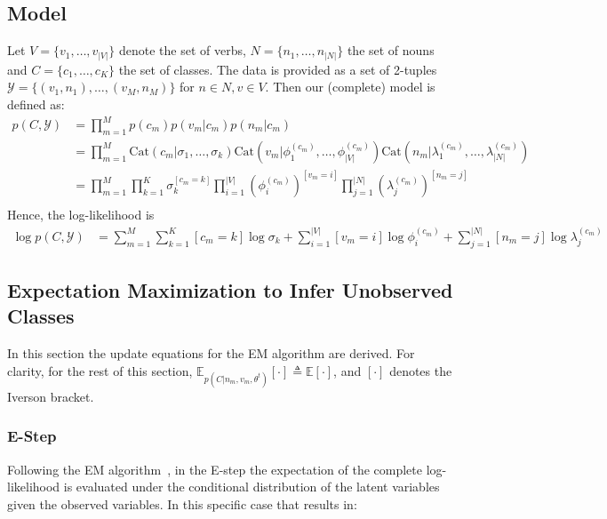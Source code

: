 \documentclass[11pt]{scrartcl}
\newcommand{\cat}{\text{Cat}}
\newcommand{\thetaold}{\theta^{t}}
\begin{document}
\subsection{Model}
\label{sec:model}
Let $V = \{v_1, \ldots, v_{|V|}\}$ denote the set of verbs, $N =
\{n_1, \ldots, n_{|N|}\}$ the set of nouns and $C = \{c_1,\ldots,
c_K\}$ the set of classes. The data is provided as a set of 2-tuples
$\mathcal{Y} = \{(v_1, n_1), \ldots, (v_M, n_M)\}$ for $n \in N, v \in V$.  Then our
(complete) model is defined as:
\begin{align}
  p(C, \mathcal{Y}) &= \prod_{m=1}^{M}p(c_m)p(v_m|c_m)p(n_m|c_m) \\
             &= \prod_{m=1}^{M}
                \cat(c_m|\sigma_1, \ldots, \sigma_k)
                \cat(v_m|\phi_1^{(c_m)}, \ldots, \phi_{|V|}^{(c_m)})
                \cat(n_m|\lambda_1^{(c_m)}, \ldots, \lambda_{|N|}^{(c_m)}) \\
             &= \prod_{m=1}^{M}
                \prod_{k=1}^K \sigma_k^{[c_m=k]} 
                \prod_{i=1}^{|V|} {(\phi_i^{(c_m)})}^{[v_m=i]}
                \prod_{j=1}^{|N|} {(\lambda_j^{(c_m)})}^{[n_m=j]} \\
 \end{align}
 Hence, the log-likelihood is
 \begin{align}
   \log p(C, \mathcal{Y})
   &=
     \sum_{m=1}^{M}
     \sum_{k=1}^K [c_m = k]\log \sigma_k +
     \sum_{i=1}^{|V|} [v_m = i]\log \phi_i^{(c_m)} +
     \sum_{j=1}^{|N|} [n_m = j]\log \lambda_j^{(c_m)}
 \end{align}


\subsection{Expectation Maximization to Infer Unobserved Classes}
\label{sec:em}
In this section the update equations for the EM algorithm are derived.
For clarity, for the rest of this section, $\mathbb{E}_{p(C | n_m, v_m,
\thetaold)}[\cdot] \triangleq \mathbb{E}[\cdot]$, and $[\cdot]$
denotes the Iverson bracket.



\subsubsection{E-Step}
\label{sec:estep}
Following the EM algorithm~\cite{dempster1977maximum}, in the E-step the expectation of the
complete log-likelihood is evaluated under the conditional
distribution of the latent variables given the observed variables.  In
this specific case that results in:
\end{document}
